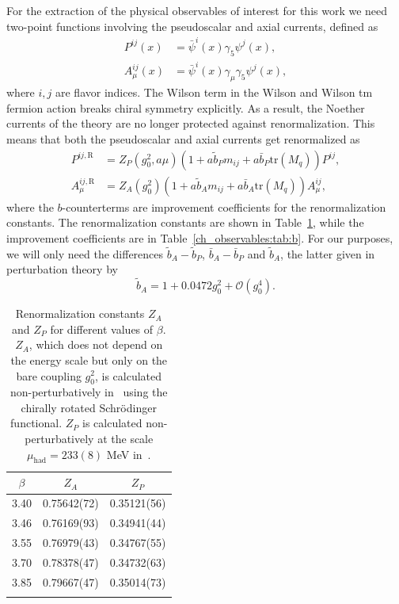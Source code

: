 For the extraction of the physical observables of interest for this work we need two-point functions involving the pseudoscalar and axial currents, defined as
\begin{align}
\label{ch_observables:eq:P}
P^{ij}(x)&=\bar{\psi}^{i}(x)\gamma_5\psi^{j}(x),\\
\label{ch_observables:eq:A}
A_{\mu}^{ij}(x)&=\bar{\psi}^i(x)\gamma_{\mu}\gamma_5\psi^{j}(x),
\end{align}
where $i,j$ are flavor indices. The Wilson term in the Wilson and Wilson tm fermion action breaks chiral symmetry explicitly. As a result, the Noether currents of the theory are no longer protected against renormalization. This means that both the pseudoscalar and axial currents get renormalized as
\begin{align}
\label{ch_observables:eq:corr_ren}
P^{ij,{\textrm{R}}}&=Z_P(g_0^2,a\mu)\left(1+a\tilde{b}_Pm_{ij}+a\bar{b}_P{\textrm{tr}}\left(M_q\right)\right)P^{ij}, \\
A_{\mu}^{ij,{\textrm{R}}}&=Z_A(g_0^2)\left(1+a\tilde{b}_Am_{ij}+a\bar{b}_A{\textrm{tr}}\left(M_q\right)\right)A_{\mu}^{ij},
\end{align}
where the $b$-counterterms are improvement coefficients for the renormalization constants. The renormalization constants are shown in Table~\ref{ch_observables:tab:Z}, while the improvement coefficients are in Table~\ref{ch_observables:tab:b}. For our purposes, we will only need the differences $\tilde{b}_A-\tilde{b}_P$, $\bar{b}_A-\bar{b}_P$ and $\tilde{b}_A$, the latter given in perturbation theory by~\citep{Taniguchi:1998pf}
\begin{equation}
\label{ch_observables:eq:bA}
\tilde{b}_A=1+0.0472g_0^2+\mathcal{O}(g_0^4).
\end{equation}

\begin{longtable}{c c c}
    \label{ch_observables:tab:Z}
    $\beta$ & $Z_A$ & $Z_P$ \\
    \toprule
    3.40 & 0.75642(72) & 0.35121(56) \\
    3.46 & 0.76169(93) & 0.34941(44) \\
    3.55 & 0.76979(43) & 0.34767(55) \\
    3.70 & 0.78378(47) & 0.34732(63) \\
    3.85 & 0.79667(47) & 0.35014(73) \\
    \bottomrule
    \caption{Renormalization constants $Z_A$ and $Z_P$ for different values of $\beta$. $Z_A$, which does not depend on the energy scale but only on the bare coupling $g_0^2$, is calculated non-perturbatively in~\citep{DallaBrida:2018tpn} using the chirally rotated Schrödinger functional. $Z_P$ is calculated non-perturbatively at the scale $\mu_{\textrm{had}}=233(8)$ MeV in~\citep{Campos:2018ahf}.}
\end{longtable}

